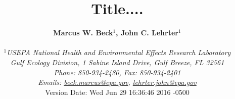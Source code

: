 \documentclass[letterpaper,12pt,oneside]{article}\usepackage[]{graphicx}\usepackage[]{color}
\begin{document}
\raggedbottom
\linenumbers
\raggedright
{}
\setlength{\parindent}{0.5in}
\renewcommand\refname{References \vspace{12pt}}

\begin{singlespace}
\title{{\bf {\Large Title....}}}
\author{
  {\bf {\normalsize Marcus W. Beck$^1$, John C. Lehrter$^1$}}
  \\\\{\textit {\normalsize $^1$USEPA National Health and Environmental Effects Research Laboratory}}
  \\{\textit {\normalsize Gulf Ecology Division, 1 Sabine Island Drive, Gulf Breeze, FL 32561}}
	\\{\textit {\normalsize Phone: 850-934-2480, Fax: 850-934-2401}}
	\\{\textit {\normalsize Emails: \href{mailto:beck.marcus@epa.gov}{beck.marcus@epa.gov}, \href{mailto:lehrter.john@epa.gov}{lehrter.john@epa.gov}}}
  \vspace{1in} 
  \\ Version Date:   Wed Jun 29 16:36:46 2016 -0500
	}
\date{}
\maketitle
\end{singlespace}
\clearpage
\end{document}
